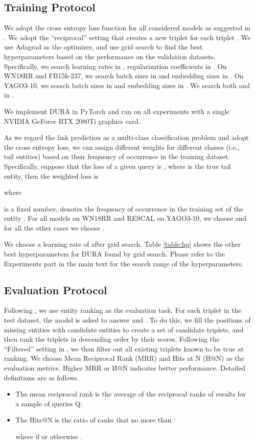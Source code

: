 \documentclass{article}
\begin{document}
\subsection{Training Protocol} 
We adopt the cross entropy loss function for all considered models as suggested in \citet{old_dog}. We adopt the ``reciprocal'' setting that creates a new triplet  for each triplet   \cite{n3,simple}. We use Adagrad \citep{adagrad} as the optimizer, and use grid search to find the best hyperparameters based on the performance on the validation datasets. Specifically, we search learning rates in , regularization coefficients in . On WN18RR and FB15k-237, we search batch sizes in  and embedding sizes in . On YAGO3-10, we search batch sizes in  and embedding sizes in . 
We search both  and  in .


We implement DURA in PyTorch and run on all experiments with a single NVIDIA GeForce RTX 2080Ti graphics card.

As we regard the link prediction as a multi-class classification problem and adopt the cross entropy loss, we can assign different weights for different classes (i.e., tail entities) based on their frequency of occurrence in the training dataset. Specifically, suppose that the loss of a given query  is , where  is the true tail entity, then the weighted loss is 

where 

 is a fixed number,  denotes the frequency of occurrence in the training set of the entity . For all models on WN18RR and RESCAL on YAGO3-10, we choose  and for all the other cases we choose .

We choose a learning rate of  after grid search. Table \ref{table:hp} shows the other best hyperparameters for DURA found by grid search. Please refer to the Experiments part in the main text for the search range of the hyperparameters.

\subsection{Evaluation Protocol} 
Following \citet{transe}, we use entity ranking as the evaluation task. For each triplet  in the test dataset, the model is asked to answer  and . To do this, we fill the positions of missing entities with candidate entities to create a set of candidate triplets, and then rank the triplets in descending order by their scores. Following the ``Filtered'' setting in \citet{transe}, we then filter out all existing triplets known to be true at ranking. We choose Mean Reciprocal Rank (MRR) and Hits at N (H@N) as the evaluation metrics. Higher MRR or H@N indicates better performance. Detailed definitions are as follows.
\begin{itemize}[itemindent=-1em]
    \item The mean reciprocal rank is the average of the reciprocal ranks of results for a sample of queries Q:
    
    \item The Hits@N is the ratio of ranks that no more than :
    
    where  if  or otherwise .
\end{itemize}
\end{document}
